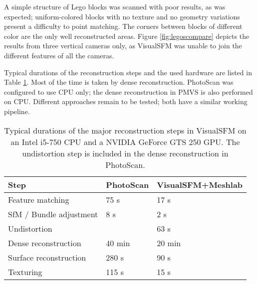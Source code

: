 
A simple structure of Lego blocks was scanned with poor results, as was expected; uniform-colored blocks with no texture and no geometry variations present a difficulty to point matching.
The corners between blocks of different color are the only well reconstructed areas.
Figure \ref{fig:legoscompare} depicts the results from three vertical cameras only, as VisualSFM was unable to join the different features of all the cameras.


Typical durations of the reconstruction steps and the used hardware are listed in Table \ref{tab:reconsttime}.
Most of the time is taken by dense reconstruction.
PhotoScan was configured to use CPU only; the dense reconstruction in PMVS is also performed on CPU.
Different approaches remain to be tested; both have a similar working pipeline.

\begin{table}[t]
	\centering
	\begin{tabular}{l l l}
		Step & PhotoScan & VisualSFM+Meshlab \\ \hline
		Feature matching & 75 s & 17 s \\
		SfM / Bundle adjustment & 8 s & 2 s\\
		Undistortion & & 63 s\\
		Dense reconstruction & 40 min & 20 min\\
		Surface reconstruction & 280 s & 90 s\\
		Texturing & 115 s & 15 s\\
	\end{tabular}
	\caption{
		Typical durations of the major reconstruction steps in VisualSFM on an Intel i5-750 CPU and a NVIDIA GeForce GTS 250 GPU.
		The undistortion step is included in the dense reconstruction in PhotoScan.
	}
	\label{tab:reconsttime}
\end{table}

